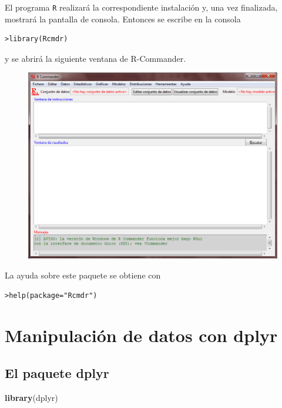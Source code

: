 \documentclass[]{book}
\newenvironment{Shaded}{\begin{snugshade}}{\end{snugshade}}
\newcommand{\KeywordTok}[1]{\textcolor[rgb]{0.13,0.29,0.53}{\textbf{#1}}}
\newcommand{\NormalTok}[1]{#1}
\begin{document}
El programa \texttt{R} realizará la correspondiente instalación y, una
vez finalizada, mostrará la pantalla de consola. Entonces se escribe en
la consola

\begin{verbatim}
>library(Rcmdr)
\end{verbatim}

y se abrirá la siguiente ventana de R-Commander.

\begin{figure}
\centering
\includegraphics{figuras/Rcommander3.png}
\caption{}
\end{figure}

La ayuda sobre este paquete se obtiene con

\begin{verbatim}
>help(package="Rcmdr")
\end{verbatim}

\chapter{Manipulación de datos con
dplyr}\label{manipulacion-de-datos-con-dplyr}

\section{\texorpdfstring{El paquete
\textbf{dplyr}}{El paquete dplyr}}\label{el-paquete-dplyr}

\begin{Shaded}
\begin{Highlighting}[]
\KeywordTok{library}\NormalTok{(dplyr)}
\end{Highlighting}
\end{Shaded}
\end{document}
